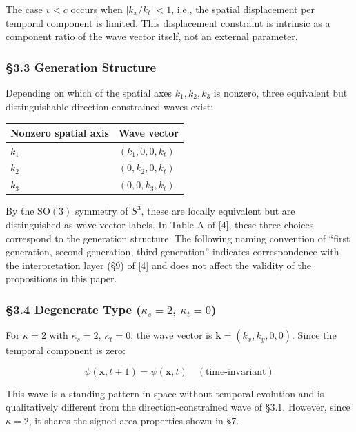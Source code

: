 \documentclass[
  a4paper,11pt]{article}
\newcounter{none}
\theoremstyle{definition}
\theoremstyle{remark}
\begin{document}
The case \(v < c\) occurs when \(|k_x / k_t| < 1\), i.e., the spatial
displacement per temporal component is limited. This displacement
constraint is intrinsic as a component ratio of the wave vector itself,
not an external parameter.

\subsubsection{§3.3 Generation Structure}\label{generation-structure}

Depending on which of the spatial axes \(k_1, k_2, k_3\) is nonzero,
three equivalent but distinguishable direction-constrained waves exist:

{\def\LTcaptype{none} %
\begin{longtable}[]{@{}ll@{}}
\toprule\noalign{}
Nonzero spatial axis & Wave vector \\
\midrule\noalign{}
\endhead
\bottomrule\noalign{}
\endlastfoot
\(k_1\) & \((k_1, 0, 0, k_t)\) \\
\(k_2\) & \((0, k_2, 0, k_t)\) \\
\(k_3\) & \((0, 0, k_3, k_t)\) \\
\end{longtable}
}

By the \(\mathrm{SO}(3)\) symmetry of \(S^3\), these are locally
equivalent but are distinguished as wave vector labels. In Table A of
{[}4{]}, these three choices correspond to the generation structure. The
following naming convention of ``first generation, second generation,
third generation'' indicates correspondence with the interpretation
layer (§9) of {[}4{]} and does not affect the validity of the
propositions in this paper.

\subsubsection{\texorpdfstring{§3.4 Degenerate Type (\(\kappa_s = 2\),
\(\kappa_t = 0\))}{§3.4 Degenerate Type (\textbackslash kappa\_s = 2, \textbackslash kappa\_t = 0)}}\label{degenerate-type-kappa_s-2-kappa_t-0}

For \(\kappa = 2\) with \(\kappa_s = 2\), \(\kappa_t = 0\), the wave
vector is \(\mathbf{k} = (k_x, k_y, 0, 0)\). Since the temporal
component is zero:

\[\psi(\mathbf{x}, t+1) = \psi(\mathbf{x}, t) \quad (\text{time-invariant})\]

This wave is a standing pattern in space without temporal evolution and
is qualitatively different from the direction-constrained wave of §3.1.
However, since \(\kappa = 2\), it shares the signed-area properties
shown in §7.
\end{document}
